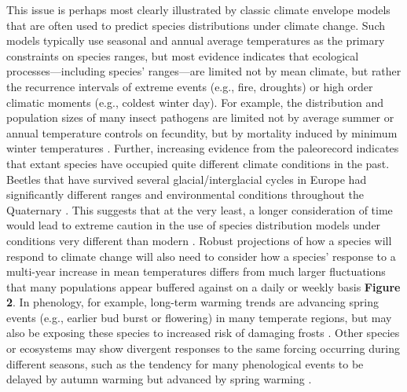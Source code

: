 \documentclass[11pt,a4paper,oneside]{article}
\begin{document}
This issue is perhaps most clearly illustrated by classic climate envelope models that are often used to predict species distributions under climate change. Such models typically use seasonal and annual average temperatures as the primary constraints on species ranges, but most evidence indicates that ecological processes---including species' ranges---are limited not by mean climate, but rather the recurrence intervals of extreme events (e.g., fire, droughts) or high order climatic moments (e.g., coldest winter day). For example, the distribution and population sizes of many insect pathogens are limited not by average summer or annual temperature controls on fecundity, but by mortality induced by minimum winter temperatures \citep{weed2013}. Further, increasing evidence from the paleorecord indicates that extant species have occupied quite different climate conditions in the past. Beetles that have survived several glacial/interglacial cycles in Europe had significantly different ranges and environmental conditions throughout the Quaternary \citep{Abellan2011}. This suggests that at the very least, a longer consideration of time would lead to extreme caution in the use of species distribution models under conditions very different than modern \citep[e.g.,][]{Williams:2007kx}. Robust projections of how a species will respond to climate change will also need to consider how a species' response to a multi-year increase in mean temperatures differs from much larger fluctuations that many populations appear buffered against on a daily or weekly basis {\bf Figure 2}. In phenology, for example, long-term warming trends are advancing spring events (e.g., earlier bud burst or flowering) in many temperate regions, but may also be exposing these species to increased risk of damaging frosts \citep[e.g.,][]{Augspurger:2009gj}. Other species or ecosystems may show divergent responses to the same forcing occurring during different seasons, such as the tendency for many phenological events to be delayed by autumn warming but advanced by spring warming \citep{Cook:2012pnas}. \\ 
\end{document}

